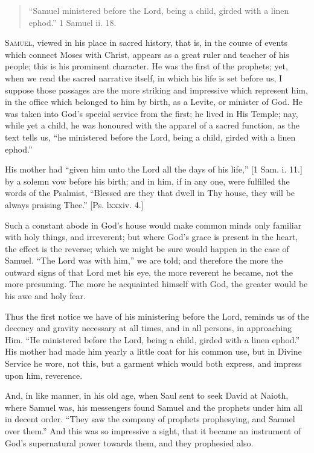 
\begin{quote}

``Samuel ministered before the Lord, being a child, girded
with a linen ephod.'' 1 Samuel ii. 18.

\end{quote}

S\textsc{amuel}, viewed in his place in sacred history, that is, in the
course of events which connect Moses with Christ, appears as a great
ruler and teacher of his people; this is his prominent character. He
was the first of the prophets; yet, when we read the sacred narrative
itself, in which his life is set before us, I suppose those passages
are the more striking and impressive which represent him, in the
office which belonged to him by birth, as a Levite, or minister of
God. He was taken into God's special service from the first; he lived
in His Temple; nay, while yet a child, he was honoured with the
apparel of a sacred function, as the text tells us, ``he
ministered before the Lord, being a child, girded with a linen
ephod.''

His mother had ``given him unto the Lord all the days of his
life,'' [1 Sam. i. 11.] by a solemn vow before his birth; and in
him, if in any one, were fulfilled the words of the Psalmist,
``Blessed are they that dwell in Thy house, they will be always
praising Thee.'' [Ps. lxxxiv. 4.]

Such a constant abode in God's house would make common minds only
familiar with holy things, and irreverent; but where God's grace is
present in the heart, the effect is the reverse; which we might be
sure would happen in the case of Samuel. ``The Lord was with
him,'' we are told; and therefore the more the outward signs of
that Lord met his eye, the more reverent he became, not the more
presuming. The more he acquainted himself with God, the greater would
be his awe and holy fear.

Thus the first notice we have of his ministering before the Lord,
reminds us of the decency and gravity necessary at all times, and in
all persons, in approaching Him. ``He ministered before the Lord,
being a child, girded with a linen ephod.'' His mother had made
him yearly a little coat for his common use, but in Divine Service he
wore, not this, but a garment which would both express, and impress
upon him, reverence.

And, in like manner, in his old age, when Saul sent to seek David
at Naioth, where Samuel was, his messengers found Samuel and the
prophets under him all in decent order. ``They saw the company of
prophets prophesying, and Samuel over them.'' And this was so impressive a sight, that it became an instrument of God's supernatural
power towards them, and they prophesied also.

